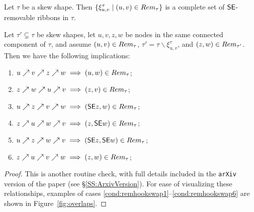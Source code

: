 \documentclass[Unicode,ALCO]{cedram}
\newcommand{\0}{{\bar 0}}
\newcommand{\ssee}{{\sf SE}}
\begin{document}
\begin{lemma}\label{xiuv}
Let \(\tau\) be a skew shape. Then \(\{ \xi^\tau_{u,v} \mid (u,v) \in \textup{Rem}_\tau\}\) is a complete set of \(\ssee\)-removable ribbons in \(\tau\).
\end{lemma}


 \begin{lemma}\label{remhookswap}
Let \(\tau' \subsetneq \tau\) be skew shapes, let \(u,v,z,w\) be nodes in the same connected component of \(\tau\), and assume \((u,v) \in \textup{Rem}_\tau\), \(\tau' = \tau \backslash \xi^{\tau}_{u,v}\), and \((z,w) \in \textup{Rem}_{\tau'}\). Then we have the following implications:
\begin{enumerate}
\item \(u \nearrow v \nearrow z \nearrow w \implies (u,w) \in \textup{Rem}_{\tau}\); \label{cond:remhookswap1}
\item \(z \nearrow w \nearrow u \nearrow v \implies (z,v) \in \textup{Rem}_\tau\); \label{cond:remhookswap2}
\item \(u \nearrow z \nearrow v \nearrow w \implies (\ssee z, w) \in \textup{Rem}_{\tau}\); \label{cond:remhookswap3}
\item \(z \nearrow u \nearrow w \nearrow v \implies (z, \ssee w) \in \textup{Rem}_{\tau}\); \label{cond:remhookswap4}
\item \(u \nearrow z \nearrow w \nearrow v \implies (\ssee z, \ssee w) \in \textup{Rem}_\tau\); \label{cond:remhookswap5}
\item \(z \nearrow u \nearrow v \nearrow w \implies (z,w) \in \textup{Rem}_\tau\); \label{cond:remhookswap6}
\end{enumerate}
 \end{lemma}
 \begin{proof}
  This is another routine check, with full details included in the \texttt{arXiv} version of the paper (see \S\ref{SS:ArxivVersion}). 
For ease of visualizing these relationships, examples of cases \eqref{cond:remhookswap1}--\eqref{cond:remhookswap6} are shown in Figure~\ref{fig:overlaps}.
\end{proof}
\end{document}
